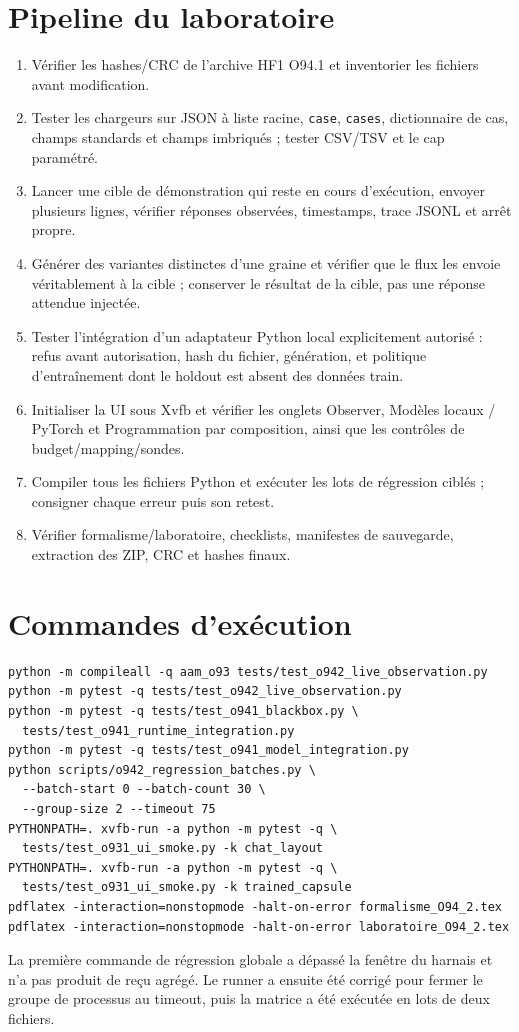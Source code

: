 \documentclass[11pt,a4paper]{article}
\begin{document}
\section{Pipeline du laboratoire}
\begin{enumerate}[leftmargin=1.5em]
  \item Vérifier les hashes/CRC de l'archive HF1 O94.1 et inventorier les fichiers avant modification.
  \item Tester les chargeurs sur JSON à liste racine, \verb|case|, \verb|cases|, dictionnaire de cas, champs standards et champs imbriqués ; tester CSV/TSV et le cap paramétré.
  \item Lancer une cible de démonstration qui reste en cours d'exécution, envoyer plusieurs lignes, vérifier réponses observées, timestamps, trace JSONL et arrêt propre.
  \item Générer des variantes distinctes d'une graine et vérifier que le flux les envoie véritablement à la cible ; conserver le résultat de la cible, pas une réponse attendue injectée.
  \item Tester l'intégration d'un adaptateur Python local explicitement autorisé : refus avant autorisation, hash du fichier, génération, et politique d'entraînement dont le holdout est absent des données train.
  \item Initialiser la UI sous Xvfb et vérifier les onglets Observer, Modèles locaux / PyTorch et Programmation par composition, ainsi que les contrôles de budget/mapping/sondes.
  \item Compiler tous les fichiers Python et exécuter les lots de régression ciblés ; consigner chaque erreur puis son retest.
  \item Vérifier formalisme/laboratoire, checklists, manifestes de sauvegarde, extraction des ZIP, CRC et hashes finaux.
\end{enumerate}

\section{Commandes d'exécution}
\begin{verbatim}
python -m compileall -q aam_o93 tests/test_o942_live_observation.py
python -m pytest -q tests/test_o942_live_observation.py
python -m pytest -q tests/test_o941_blackbox.py \
  tests/test_o941_runtime_integration.py
python -m pytest -q tests/test_o941_model_integration.py
python scripts/o942_regression_batches.py \
  --batch-start 0 --batch-count 30 \
  --group-size 2 --timeout 75
PYTHONPATH=. xvfb-run -a python -m pytest -q \
  tests/test_o931_ui_smoke.py -k chat_layout
PYTHONPATH=. xvfb-run -a python -m pytest -q \
  tests/test_o931_ui_smoke.py -k trained_capsule
pdflatex -interaction=nonstopmode -halt-on-error formalisme_O94_2.tex
pdflatex -interaction=nonstopmode -halt-on-error laboratoire_O94_2.tex
\end{verbatim}
La première commande de régression globale a dépassé la fenêtre du harnais et n'a pas produit de reçu agrégé. Le runner a ensuite été corrigé pour fermer le groupe de processus au timeout, puis la matrice a été exécutée en lots de deux fichiers.
\end{document}
